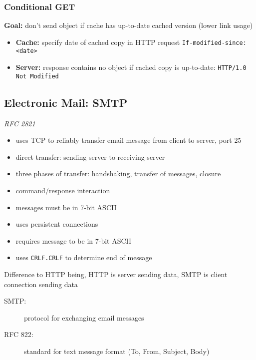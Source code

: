 \subsubsection{Conditional GET}
\begin{leftbar}
	\textbf{Goal:} don't send object if cache has up-to-date cached version (lower link usage)
\end{leftbar}
\begin{itemize}
	\item \textbf{Cache:} specify date of cached copy in HTTP request \texttt{If-modified-since: <date>}
	\item \textbf{Server:} response contains no object if cached copy is up-to-date: \texttt{HTTP/1.0 Not Modified}
\end{itemize}

\subsection{Electronic Mail: SMTP}
\textit{RFC 2821}
\begin{itemize}
	\item uses TCP to reliably transfer email message from client to server, port 25
	\item direct transfer: sending server to receiving server
	\item three phases of transfer: handshaking, transfer of messages, closure
	\item command/response interaction
	\item messages must be in 7-bit ASCII
	\item uses persistent connections
	\item requires message to be in 7-bit ASCII
	\item uses \texttt{CRLF.CRLF} to determine end of message
\end{itemize}
Difference to HTTP being, HTTP is server sending data, SMTP is client connection sending data\\
\begin{description}
	\item[SMTP:] protocol for exchanging email messages
	\item[RFC 822:] standard for text message format (To, From, Subject, Body)
\end{description}

